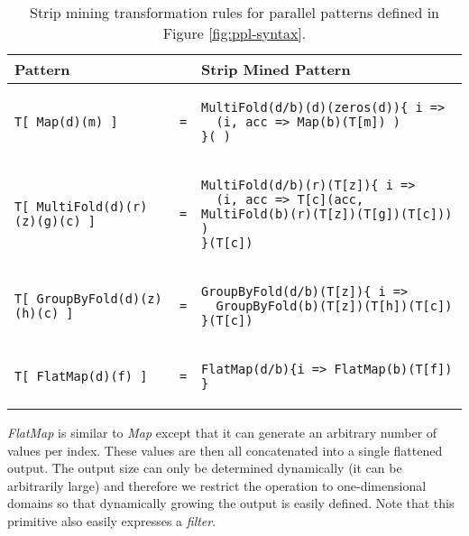 \documentclass[pageno]{jpaper}
\begin{document}
\begin{table*}[t]
\small\centering
\begin{tabular}{@{}lll@{}}
\toprule
{\bf Pattern }    & { }  & {\bf Strip Mined Pattern} \\ \midrule
{\begin{lstlisting}[mathescape=true,numbers=none,basicstyle=\fontsize{8}{8}\selectfont\tt]
T[ Map(d)(m) ]
\end{lstlisting}
} & \texttt{=} &
{\begin{lstlisting}[mathescape=true,numbers=none,basicstyle=\fontsize{8}{8}\selectfont\tt]
MultiFold(d/b)(d)(zeros(d)){ i =>
  (i, acc => Map(b)(T[m]) )
}(_)
\end{lstlisting}
} \\ \midrule
{\begin{lstlisting}[mathescape=true,numbers=none,basicstyle=\fontsize{8}{8}\selectfont\tt]
T[ MultiFold(d)(r)(z)(g)(c) ]
\end{lstlisting}
} & \texttt{=} &
{\begin{lstlisting}[mathescape=true,numbers=none,basicstyle=\fontsize{8}{8}\selectfont\tt]
MultiFold(d/b)(r)(T[z]){ i =>
  (i, acc => T[c](acc, MultiFold(b)(r)(T[z])(T[g])(T[c])) )
}(T[c])
\end{lstlisting}
} \\ \midrule
{\begin{lstlisting}[mathescape=true,numbers=none,basicstyle=\fontsize{8}{8}\selectfont\tt]
T[ GroupByFold(d)(z)(h)(c) ]
\end{lstlisting}
} & \texttt{=} &
{\begin{lstlisting}[mathescape=true,numbers=none,basicstyle=\fontsize{8}{8}\selectfont\tt]
GroupByFold(d/b)(T[z]){ i =>
  GroupByFold(b)(T[z])(T[h])(T[c])
}(T[c])
\end{lstlisting}
} \\ \midrule
{\begin{lstlisting}[mathescape=true,numbers=none,basicstyle=\fontsize{8}{8}\selectfont\tt]
T[ FlatMap(d)(f) ]
\end{lstlisting}
} & \texttt{=} &
{\begin{lstlisting}[mathescape=true,numbers=none,basicstyle=\fontsize{8}{8}\selectfont\tt]
FlatMap(d/b){i => FlatMap(b)(T[f]) }
\end{lstlisting}
} \\ \bottomrule
\end{tabular}
\caption{Strip mining transformation rules for parallel patterns defined in Figure \ref{fig:ppl-syntax}. }
\label{table:stripmining}
\end{table*} 
\emph{FlatMap} is similar to \emph{Map} except that it can generate an arbitrary number of values per index.  These values are then all concatenated into a single flattened output. The output size can only be determined dynamically (it can be arbitrarily large) and therefore we restrict the operation to one-dimensional domains so that dynamically growing the output is easily defined. Note that this primitive also easily expresses a \emph{filter}.
\end{document}
